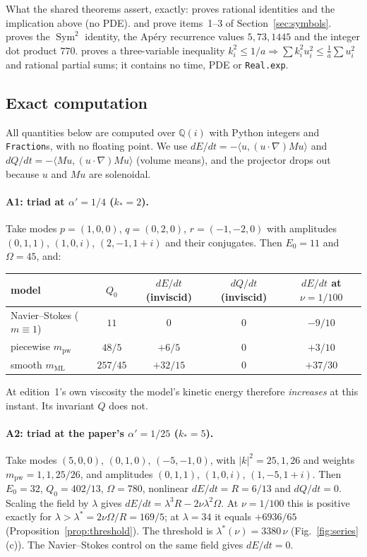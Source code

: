\documentclass[11pt,a4paper]{article}
\theoremstyle{definition}
\newcommand{\lean}[1]{\path{#1}}
\begin{document}
What the shared theorems assert, exactly: \lean{P2_T1} proves rational identities and the implication above (no PDE). \lean{P2_T2} and \lean{P2_T3} prove items~1--3 of Section~\ref{sec:symbols}. \lean{P2_T4} proves the $\operatorname{Sym}^2$ identity, the Ap\'ery recurrence values $5,73,1445$ and the integer dot product $770$. \lean{P2_T5} proves a three-variable inequality $k_i^2\le1/a\Rightarrow\sum k_i^2u_i^2\le\frac1a\sum u_i^2$ and rational partial sums; it contains no time, PDE or \texttt{Real.exp}.

\subsection{Exact computation}
\label{sec:exact}
All quantities below are computed over $\mathbb{Q}(i)$ with Python integers and \texttt{Fraction}s, with no floating point. We use $dE/dt=-\langle u,(u\cdot\nabla)Mu\rangle$ and $dQ/dt=-\langle Mu,(u\cdot\nabla)Mu\rangle$ (volume means), and the projector drops out because $u$ and $Mu$ are solenoidal.

\paragraph{A1: triad at $\alpha'=1/4$ ($k_*=2$).} Take modes $p=(1,0,0)$, $q=(0,2,0)$, $r=(-1,-2,0)$ with amplitudes $(0,1,1)$, $(1,0,i)$, $(2,-1,1+i)$ and their conjugates. Then $E_0=11$ and $\Omega=45$, and:
\begin{center}\small
\begin{tabular}{lcccc}
\toprule
model & $Q_0$ & $dE/dt$ (inviscid) & $dQ/dt$ (inviscid) & $dE/dt$ at $\nu=1/100$ \\
\midrule
Navier--Stokes ($m\equiv1$) & $11$ & $0$ & $0$ & $-9/10$ \\
piecewise $m_{\mathrm{pw}}$ & $48/5$ & $+6/5$ & $0$ & $+3/10$ \\
smooth $m_{\mathrm{ML}}$ & $257/45$ & $+32/15$ & $0$ & $+37/30$ \\
\bottomrule
\end{tabular}
\end{center}
At edition~1's own viscosity the model's kinetic energy therefore \emph{increases} at this instant. Its invariant $Q$ does not.

\paragraph{A2: triad at the paper's $\alpha'=1/25$ ($k_*=5$).} Take modes $(5,0,0)$, $(0,1,0)$, $(-5,-1,0)$, with $|k|^2=25,1,26$ and weights $m_{\mathrm{pw}}=1,1,25/26$, and amplitudes $(0,1,1)$, $(1,0,i)$, $(1,-5,1+i)$. Then $E_0=32$, $Q_0=402/13$, $\Omega=780$, nonlinear $dE/dt=R=6/13$ and $dQ/dt=0$. Scaling the field by $\lambda$ gives $dE/dt=\lambda^3R-2\nu\lambda^2\Omega$. At $\nu=1/100$ this is positive exactly for $\lambda>\lambda^*=2\nu\Omega/R=169/5$; at $\lambda=34$ it equals $+6936/65$ (Proposition~\ref{prop:threshold}). The threshold is $\lambda^*(\nu)=3380\,\nu$ (Fig.~\ref{fig:series}(c)). The Navier--Stokes control on the same field gives $dE/dt=0$.
\end{document}
